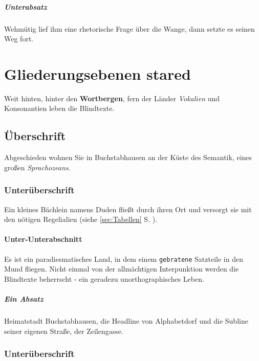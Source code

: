 \documentclass[%
	12pt,%
	a4paper,%
	oneside,%
 liststotoc, idxtotoc, bibtotoc, %
	halfparskip,%
	nochapterprefix,%
	appendixprefix, %
smallheadings,%
]{scrreprt}
\begin{document}
\paragraph{Unterabsatz}
Wehmütig lief ihm eine rhetorische Frage über die Wange, dann setzte es seinen Weg fort.
\chapter*{Gliederungsebenen stared}
\label{sec:Gliederung3}

Weit hinten, hinter den \textbf{Wortbergen}, fern der Länder \textit{Vokalien} und Konsonantien leben die Blindtexte.

\section*{Überschrift}

Abgeschieden wohnen Sie in Buchstabhausen an der Küste des Semantik, eines großen \textsl{Sprachozeans}. 

\subsection*{Unterüberschrift}

Ein kleines Bächlein namens Duden fließt durch ihren Ort und versorgt sie mit den nötigen Regelialien (siehe \ref{sec:Tabellen} S. \pageref{sec:Tabellen}).

\subsubsection*{Unter-Unterabschnitt}

Es ist ein paradiesmatisches Land, in dem einem \texttt{gebratene} Satzteile in den Mund fliegen. Nicht einmal von der allmächtigen Interpunktion werden die Blindtexte beherrscht - ein geradezu unorthographisches Leben. 

\paragraph*{Ein Absatz}
Heimatstadt Buchstabhausen, die Headline von Alphabetdorf und die Subline seiner eigenen Straße, der Zeilengasse.

\subsection*{Unterüberschrift}
\end{document}
